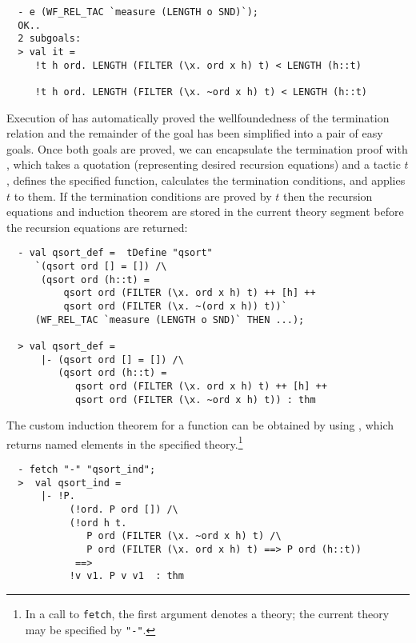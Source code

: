 \begin{session}
\begin{verbatim}
  - e (WF_REL_TAC `measure (LENGTH o SND)`);
  OK..
  2 subgoals:
  > val it =
     !t h ord. LENGTH (FILTER (\x. ord x h) t) < LENGTH (h::t)

     !t h ord. LENGTH (FILTER (\x. ~ord x h) t) < LENGTH (h::t)
\end{verbatim}
\end{session}
%
Execution of  has automatically proved the
wellfoundedness of the termination relation
and the remainder of the goal has been simplified into a
pair of easy goals. Once both goals are proved, we can encapsulate
the termination proof with , which takes a quotation
(representing desired recursion equations) and a tactic $t$,
defines the specified function, calculates the termination conditions,
and applies $t$ to them. If the termination conditions are proved by
$t$ then the recursion equations and induction theorem are stored
in the current theory segment before the recursion equations are returned:

\begin{session}
\begin{verbatim}
  - val qsort_def =  tDefine "qsort"
     `(qsort ord [] = []) /\
      (qsort ord (h::t) =
          qsort ord (FILTER (\x. ord x h) t) ++ [h] ++
          qsort ord (FILTER (\x. ~(ord x h)) t))`
     (WF_REL_TAC `measure (LENGTH o SND)` THEN ...);

  > val qsort_def =
      |- (qsort ord [] = []) /\
         (qsort ord (h::t) =
            qsort ord (FILTER (\x. ord x h) t) ++ [h] ++
            qsort ord (FILTER (\x. ~ord x h) t)) : thm
\end{verbatim}
\end{session}

The custom induction theorem for a function can be obtained by using ,
which returns named elements in the specified theory.\footnote{In a call to \texttt{fetch}, the
first argument denotes a theory; the current theory may be specified by \texttt{"-"}.}
\begin{session}
\begin{verbatim}
  - fetch "-" "qsort_ind";
  >  val qsort_ind =
      |- !P.
           (!ord. P ord []) /\
           (!ord h t.
              P ord (FILTER (\x. ~ord x h) t) /\
              P ord (FILTER (\x. ord x h) t) ==> P ord (h::t))
            ==>
           !v v1. P v v1  : thm
\end{verbatim}
\end{session}

